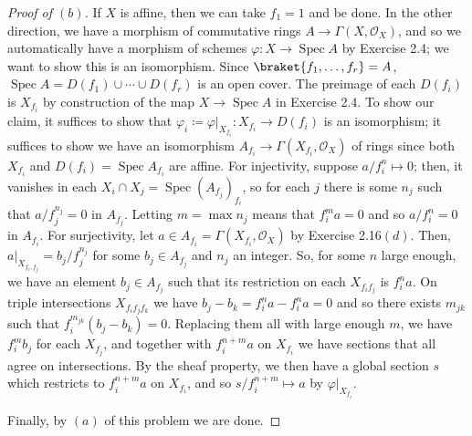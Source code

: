 \documentclass[10pt]{article}
\theoremstyle{definition}
\theoremstyle{remark}
\numberwithin{equation}{section}
\numberwithin{figure}{subsubsection}
\DeclareMathOperator{\Spec}{Spec}
\DeclareMathOperator{\id}{id}
\newcommand{\OO}{\mathcal{O}}
\begin{document}
\begin{proof}[Proof of $(b)$]
  If $X$ is affine, then we can take $f_1 = 1$ and be done. In the other
  direction, we have a morphism of commutative rings $A \to \Gamma(X,\OO_X)$,
  and so we automatically have a morphism of schemes $\varphi\colon X \to \Spec
  A$ by Exercise 2.4; we want to show this is an isomorphism.
  Since $\braket{f_1,\ldots,f_r} = A$, $\Spec A = D(f_1) \cup \cdots \cup
  D(f_r)$ is an open cover. The preimage of each $D(f_i)$ is $X_{f_i}$ by
  construction of the map $X \to \Spec A$ in Exercise 2.4. To show our
  claim, it suffices to show that $\varphi_i \coloneqq
  \varphi\vert_{X_{f_i}}\colon X_{f_i} \to D(f_i)$ is an isomorphism; it
  suffices to show we have an isomorphism $A_{f_i} \to \Gamma(X_{f_i},\OO_X)$ of
  rings since both $X_{f_i}$ and $D(f_i) = \Spec A_{f_i}$ are affine. For
  injectivity, suppose $a/f_i^n \mapsto 0$; then, it vanishes in each $X_i \cap
  X_j = \Spec(A_{f_j})_{f_i}$, so for each $j$ there is some $n_j$ such that
  $a/f_j^{n_j} = 0$ in $A_{f_j}$. Letting $m = \max n_j$ means that $f_i^ma = 0$
  and so $a/f_i^n = 0$ in $A_{f_i}$. For surjectivity, let $a \in A_{f_i} =
  \Gamma(X_{f_i},\OO_X)$ by Exercise 2.16$(d)$. Then,
  $a\vert_{X_{f_i,f_j}} = b_j/f_j^{n_j}$ for some $b_j \in A_{f_j}$ and $n_j$ an
  integer. So, for some $n$ large enough, we have an element $b_j \in A_{f_j}$ such that its restriction on each $X_{f_if_j}$ is $f_i^{n}a$. On triple intersections $X_{f_if_jf_k}$ we have $b_j - b_k = f_i^na - f_i^na = 0$ and so there exists $m_{jk}$ such that $f_i^{m_{jk}}(b_j-b_k) = 0$. Replacing them all with large enough $m$, we have $f_i^mb_j$ for each $X_{f_j}$, and together with $f_i^{n+m}a$ on $X_{f_i}$ we have sections that all agree on intersections. By the sheaf property, we then have a global section $s$ which restricts to $f_i^{n+m}a$ on $X_{f_i}$, and so $s/f_i^{n+m} \mapsto a$ by $\varphi\vert_{X_{f_i}}$.
  \par Finally, by $(a)$ of this problem we are done.
\end{proof}
\end{document}
